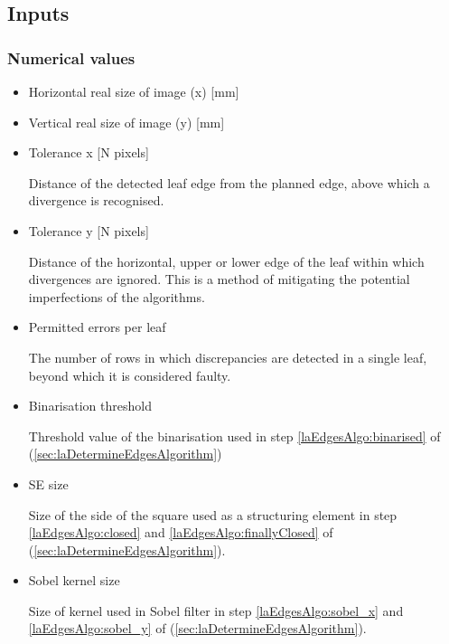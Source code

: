 \subsection{Inputs} \label{sec:laAnalysisInputs}

\subsubsection{Numerical values}

\begin{itemize}

    \item Horizontal real size of image (x) [mm]

    \item Vertical real size of image (y) [mm]

    \item Tolerance x [N pixels]

    Distance of the detected leaf edge from the planned edge, above which a divergence is recognised.

    \item Tolerance y [N pixels]

    Distance of the horizontal, upper or lower edge of the leaf within which divergences are ignored. This is a method of mitigating the potential imperfections of the algorithms.

    \item Permitted errors per leaf

    The number of rows in which discrepancies are detected in a single leaf, beyond which it is considered faulty.

    \item Binarisation threshold

    Threshold value of the binarisation used in step \ref{laEdgesAlgo:binarised} of  (\autoref{sec:laDetermineEdgesAlgorithm})

    \item SE size

    Size of the side of the square used as a structuring element in step \ref{laEdgesAlgo:closed} and \ref{laEdgesAlgo:finallyClosed} of  (\autoref{sec:laDetermineEdgesAlgorithm}).

    \item Sobel kernel size

    Size of kernel used in Sobel filter in step \ref{laEdgesAlgo:sobel_x} and \ref{laEdgesAlgo:sobel_y} of  (\autoref{sec:laDetermineEdgesAlgorithm}).

\end{itemize}

